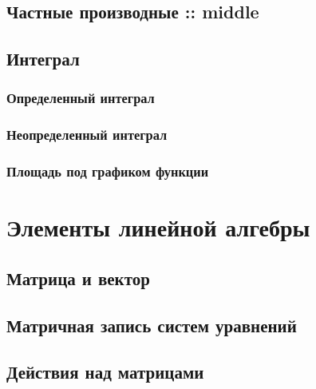 \documentclass[
  letterpaper,
]{scrbook}
\theoremstyle{definition}
\theoremstyle{remark}
\begin{document}
\section{Частные производные ::
middle}\label{math-analysis-partialderiv}

\section{Интеграл}\label{math-analysis-integral}

\subsection{Определенный
интеграл}\label{math-analysis-integral-definite}

\subsection{Неопределенный
интеграл}\label{math-analysis-integral-indefinite}

\subsection{Площадь под графиком
функции}\label{math-analysis-integral-auc}


\chapter{Элементы линейной алгебры}\label{math-linal}

\section{Матрица и
вектор}\label{ux43cux430ux442ux440ux438ux446ux430-ux438-ux432ux435ux43aux442ux43eux440}

\section{Матричная запись систем
уравнений}\label{ux43cux430ux442ux440ux438ux447ux43dux430ux44f-ux437ux430ux43fux438ux441ux44c-ux441ux438ux441ux442ux435ux43c-ux443ux440ux430ux432ux43dux435ux43dux438ux439}

\section{Действия над
матрицами}\label{ux434ux435ux439ux441ux442ux432ux438ux44f-ux43dux430ux434-ux43cux430ux442ux440ux438ux446ux430ux43cux438}
\end{document}
